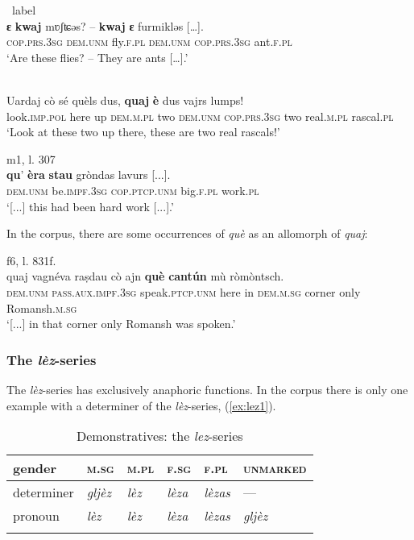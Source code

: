 \ea\
label{}
\\
\gll \textbf{ɛ} \textbf{kwaj} mʋʃʨəs? – \textbf{kwaj} \textbf{ɛ} furmikləs […].\\
     \textsc{cop.prs.3sg} \textsc{dem.unm} fly.\textsc{f.pl} \textsc{}  \textsc{dem.unm} \textsc{cop.prs.3sg} ant.\textsc{f.pl}\\
\glt `Are these flies? – They are ants […].'
\z

\ea
\label{}
\\
\gll Uardaj cò sé quèls dus, \textbf{quaj} \textbf{è} dus vajrs lumps!\\
     look.\textsc{imp.pol} here up \textsc{dem.m.pl} two \textsc{dem.unm} \textsc{cop.prs.3sg} two real.\textsc{m.pl} rascal.\textsc{pl}  \\
\glt `Look at these two up there, these are two real rascals!'
\z

\ea
\label{}
 {m1, l. 307}\\
\gll    [...] \textbf{qu}’ \textbf{èra} \textbf{stau} gròndas lavurs [...].\\
{} \textsc{dem.unm} be.\textsc{impf.3sg} \textsc{cop.ptcp.unm} big.\textsc{f.pl} work.\textsc{pl}\\
\glt `[...] this had been  hard work [...].'
\z

In the corpus, there are some occurrences of \textit{què} as an allomorph of \textit{quaj}:

\ea
\label{}
 {f6, l. 831f.}\\
\gll    [...] quaj vagnéva raṣdau cò ajn \textbf{què} \textbf{cantún} mù ròmòntsch.\\
{} \textsc{dem.unm} \textsc{pass.aux.impf.3sg} speak.\textsc{ptcp.unm} here in  \textsc{dem.m.sg} corner only Romansh.\textsc{m.sg}\\
\glt `[...] in that corner only Romansh was spoken.'
\z

\subsubsection{The \textit{lèz}-series}

The \textit{lèz}-series has exclusively anaphoric functions. In the corpus there is only one example with a determiner of the \textit{lèz}-series, (\ref{ex:lez1}).

\begin{table}
\caption{Demonstratives: the \textit{lez}-series}
\label{demlez}
 \begin{tabular}{llllll}
  \lsptoprule
         gender   & \textsc{m.sg} & \textsc{m.pl} & \textsc{f.sg} & \textsc{f.pl} & \textsc{unmarked}\\
  \midrule
  determiner  & \textit{gljèz} &  \textit{lèz}  & \textit{lèza}  & \textit{lèzas} & ---\\
  pronoun  & \textit{lèz} & \textit{lèz} & \textit{lèza} & \textit{lèzas} & \textit{gljèz} \\
  \lspbottomrule
 \end{tabular}
\end{table}

